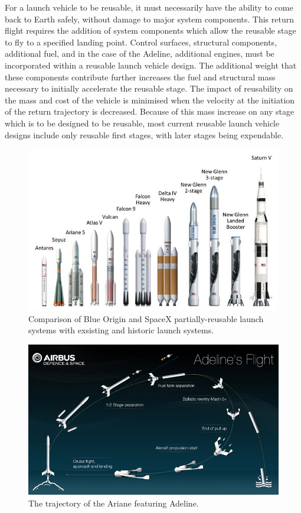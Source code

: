   For a launch vehicle to be reusable, it must necessarily have the ability to come back to Earth safely, without damage to major system components. This return flight requires the addition of system components which allow the reusable stage to fly to a specified landing point. Control surfaces\cite{Clark2018}, structural components\cite{Sarigul2003}, additional fuel\cite{Sarigul2003}, and in the case of the Adeline, additional engines\cite{Adeline}, must be incorporated within a reusable launch vehicle design. The additional weight that these components contribute further increases the fuel and structural mass necessary to initially accelerate the reusable stage. The impact of reusability on the mass and cost of the vehicle is minimised when the velocity at the initiation of the return trajectory is decreased. Because of this mass increase on any stage which is to be designed to be reusable, most current reusable launch vehicle designs include only reusable first stages, with later stages being expendable. 
  


  
  

  
  
  
  
  
  
  \begin{figure}
\centering
\includegraphics[width=0.9\linewidth]{figures/2_literature-review/LaunchVehicles}
\caption{Comparison of Blue Origin and SpaceX partially-reusable launch systems with exsisting and historic launch systems\cite{BlueOrigin}.}
\label{fig:LaunchVehicles}
\end{figure}

\begin{figure}
\centering
\includegraphics[width=0.7\linewidth]{figures/2_literature-review/visuel_adeline1}
\caption{The trajectory of the Ariane featuring Adeline\cite{Adelineb}.}
\label{fig:visuel_adeline1}
\end{figure}


